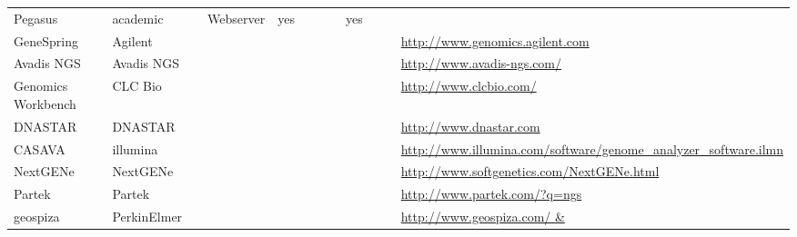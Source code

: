\documentclass{article}
\begin{document}
\begin{landscape}
\begin{table}[htdp]
\begin{center}
\begin{tabular}{|p{2cm}|p{0.6cm}|p{1cm}|p{2cm}|p{1cm}|p{1cm}|p{1cm}|p{1cm}|p{1cm}|p{1cm}|p{1cm}|p{1cm}|p{4cm}|}
Pegasus &  & academic &  & Webserver & yes &  &  &  & yes &  &  &  \\
GeneSpring &  & Agilent &  &  &  &  &  &  &  &  &  & \url{http://www.genomics.agilent.com} \\
Avadis NGS &  & Avadis NGS &  &  &  &  &  &  &  &  &  & \url{http://www.avadis-ngs.com/} \\
Genomics Workbench &  & CLC Bio &  &  &  &  &  &  &  &  &  & \url{http://www.clcbio.com/} \\
DNASTAR &  & DNASTAR &  &  &  &  &  &  &  &  &  & \url{http://www.dnastar.com} \\
CASAVA &  & illumina &  &  &  &  &  &  &  &  &  & \url{http://www.illumina.com/software/genome\_analyzer\_software.ilmn} \\
NextGENe &  & NextGENe &  &  &  &  &  &  &  &  &  & \url{http://www.softgenetics.com/NextGENe.html} \\
Partek &  & Partek &  &  &  &  &  &  &  &  &  & \url{http://www.partek.com/?q=ngs} \\
geospiza &  & PerkinElmer &  &  &  &  &  &  &  &  &  & \url{http://www.geospiza.com/ & } \\
\hline
\end{tabular}
\end{center}
\label{Published pipeline tools}
\end{table}%
\end{landscape}



\end{document}
